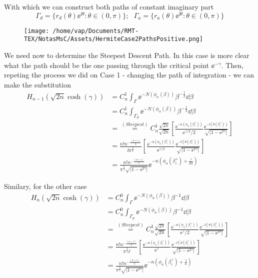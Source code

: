 With which we can construct both paths of constant imaginary part 
\[\Gamma_d = \{ r_d(\theta) \ee^{\ii \theta} : \theta \in (0, \pi) \}; \ \ \ \Gamma_a = \{ r_a(\theta) \ee^{\ii \theta} : \theta \in (0, \pi) \} \]

\begin{figure}[h!]
	\centering
	\texttt{[image: /home/vap/Documents/RMT-TEX/NotasMsC/Assets/HermiteCase2PathsPositive.png]}
\end{figure}

We need now to determine the Steepest Descent Path. In this case is more clear what the path should be the one passing through the critical point $\ee^{-\gamma}$.  Then, repeting the process we did on Case 1 - changing the path of integration - we can make the substitution
\begin{equation*}
	\begin{split}
		H_{n-1}(\sqrt{2n}\cosh{(\gamma)}) &= C_n^1 \int_{\Gamma}  \ee^{-N(\phi_\alpha(\beta))} \beta^{-\frac{1}{2}} \dd \beta \\
		&= C_n^1   \int_{\Gamma_d}  \ee^{-N(\phi_\alpha(\beta))} \beta^{-\frac{1}{2}} \dd \beta \\
		&= \stackrel{(Steepest)}{=}  C_n^1  \frac{\sqrt{2\pi}}{\sqrt{2n}} \left[  \frac{\ee^{-n(\phi_\alpha(\beta_c^+))}}{\ee^{\gamma/2}/2} \frac{\ee^{-\ii (\theta(\beta_c^+))}}{\sqrt{|1 - \ee^{2\gamma}|}}\right]  \\
		&= \frac{n! n^{-\frac{(n+1)}{2}}}{\ii  \pi^{\frac{3}{2}}} \left[  \frac{\ee^{-n(\phi_\alpha(\beta_c^+))}}{\ee^{\gamma/2}} \frac{\ee^{-\ii (\theta(\beta_c^+))}}{\sqrt{|1 - \ee^{2\gamma}|}}\right]  \\
		&= \frac{n! n^{-\frac{(n+1)}{2}}}{\pi^{\frac{3}{2}} \sqrt{|1 - \ee^{2\gamma}|} } \ee^{-n(\phi_\alpha(\beta_c^+) + \frac{\gamma}{2n})}
	\end{split}
\end{equation*}

Similary, for the other case
\begin{equation*}
	\begin{split}
		H_{n}(\sqrt{2n}\cosh{(\gamma)}) &= C_n^0 \int_{\Gamma}  \ee^{-N(\phi_\alpha(\beta))} \beta^{-1} \dd \beta \\
		&= C_n^0  \int_{\Gamma_d}  \ee^{-N(\phi_\alpha(\beta))} \beta^{-1} \dd \beta \\
		&= \stackrel{(Steepest)}{=}  C_n^1  \frac{\sqrt{2\pi}}{\sqrt{2n}} \left[  \frac{\ee^{-n(\phi_\alpha(\beta_c^+))}}{\ee^{\gamma}/2} \frac{\ee^{-\ii (\theta(\beta_c^+))}}{\sqrt{|1 - \ee^{2\gamma}|}}\right]  \\
		&=  \frac{n!n^{-\frac{(n+1)}{2}}}{\pi^{\frac{3}{2}} \ii} \left[  \frac{\ee^{-n(\phi_\alpha(\beta_c^+))}}{\ee^{\gamma}} \frac{\ee^{-\ii (\theta(\beta_c^+))}}{\sqrt{|1 - \ee^{2\gamma}|}}\right]  \\
		&= \frac{n! n^{-\frac{(n+1)}{2}}}{\pi^{\frac{3}{2}} \sqrt{|1 - \ee^{2\gamma}|} } \ee^{-n(\phi_\alpha(\beta_c^+) + \frac{\gamma}{n})}
	\end{split}
\end{equation*}



